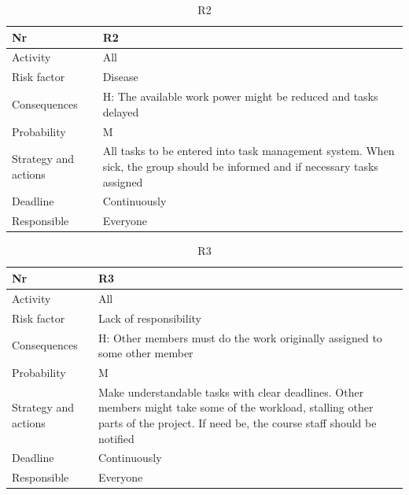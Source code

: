 \documentclass[11pt]{book}
\begin{document}
\begin{table}[H]
\centering
\begin{tabular}{ l  p{11cm} }
Nr & R2\\
\hline
Activity & All\\
\hline
Risk factor & Disease\\
\hline
Consequences & H: The available work power might be reduced and tasks delayed\\
\hline
Probability & M\\
\hline
Strategy and actions & All tasks to be entered into task management system. When sick, the group should be informed and if necessary tasks assigned\\
\hline
Deadline & Continuously\\
\hline
Responsible & Everyone\\

\end{tabular}
\label{tab:risk_2}
\caption{R2}
\end{table}

\begin{table}[H]
\centering
\begin{tabular}{ l  p{11cm} }
Nr & R3\\
\hline
Activity & All\\
\hline
Risk factor & Lack of responsibility\\
\hline
Consequences & H: Other members must do the work originally assigned to some other member\\
\hline
Probability & M\\
\hline
Strategy and actions & Make understandable tasks with clear deadlines. Other members might take some of the workload, stalling other parts of the project. If need be, the course staff should be notified\\
\hline
Deadline & Continuously\\
\hline
Responsible & Everyone\\

\end{tabular}
\label{tab:risk_3}
\caption{R3}
\end{table}
\end{document}
